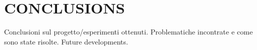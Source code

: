 \documentclass[letterpaper, 10 pt, conference]{ieeeconf}  %
\begin{document}
\section{CONCLUSIONS}

Conclusioni sul progetto/esperimenti ottenuti.
Problematiche incontrate e come sono state risolte.
Future developments.

\addtolength{\textheight}{-12cm}   %
%
%
%




\end{document}
